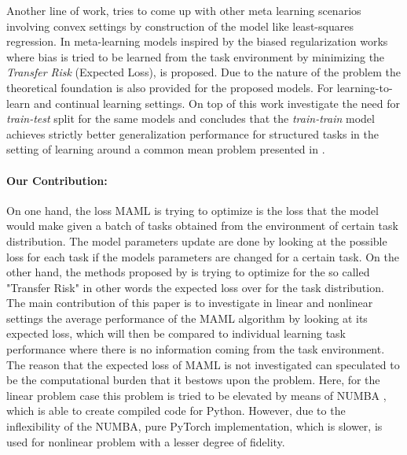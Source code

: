 Another line of work, tries to come up with other meta learning scenarios involving convex settings by construction of the model like least-squares regression. In \cite{Denevi2018a, Denevi2019} meta-learning models inspired by the biased regularization works \cite{Kuzborskij2017, Kuzborskij2017a} where bias is tried to be learned from the task environment by minimizing the \textit{Transfer Risk} (Expected Loss), is proposed. Due to the nature of the problem the theoretical foundation is also provided for the proposed models. For  learning-to-learn and continual learning settings. On top of this work \cite{Bai2020} investigate the need for \textit{train-test} split for the same models and concludes that the \textit{train-train} model achieves strictly better generalization performance for structured tasks in the setting of learning around a common mean problem presented in \cite{Denevi2018a}. 


\paragraph{Our Contribution:} On one hand, the loss MAML \cite{Finn2017} is trying to optimize is the loss that the model would make given a batch of tasks obtained from the environment of certain task distribution. The model parameters update are done by looking at the possible loss for each task if the models parameters are changed for a certain task. On the other hand, the methods proposed by \cite{Denevi2018a} is trying to optimize for the so called "Transfer Risk" in other words the expected loss over for the task distribution. The main contribution of this paper is to investigate in linear and nonlinear settings the average performance of the MAML algorithm by looking at its expected loss, which will then be compared to individual learning task performance where there is no information coming from the task environment. The reason that the expected loss of MAML is not investigated can speculated to be the computational burden that it bestows upon the problem. Here, for the linear problem case this problem is tried to be elevated by means of NUMBA \cite{Lam2015}, which is able to create compiled code for Python. However, due to the inflexibility of the NUMBA, pure PyTorch \cite{Paszke2019} implementation, which is slower, is used for nonlinear problem with a lesser degree of fidelity. 

